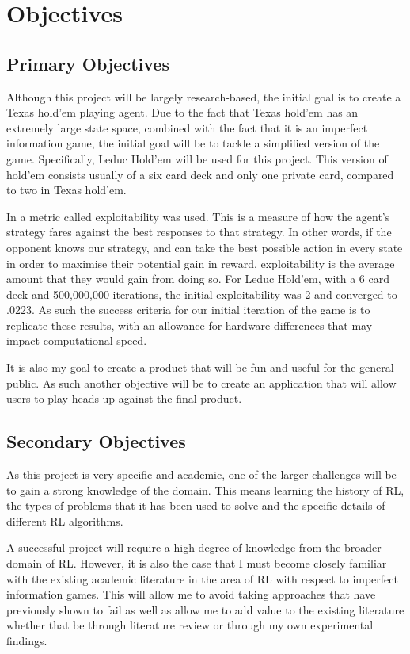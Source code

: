\section{Objectives}\label{sec:objectives}
\subsection{Primary Objectives}\label{subsec:primaryObjectives}

Although this project will be largely research-based, the initial goal is to create a Texas hold'em
playing agent.
Due to the fact that Texas hold'em has an extremely large state space, combined with the fact that it
is an imperfect information game, the initial goal will be to tackle a simplified version of the game.
Specifically, Leduc Hold'em will be used for this project.
This version of hold'em consists usually of a six card deck and only one private card, compared to two in Texas hold'em.

In\citep{heinrich2015smooth} a metric called exploitability was used.
This is a measure of how the agent's strategy fares against the best responses to that strategy.
In other words, if the opponent knows our strategy, and can take the best possible action
in every state in order to maximise their potential gain in reward, exploitability is the average amount
that they would gain from doing so.
For Leduc Hold'em, with a 6 card deck and 500,000,000 iterations, the initial exploitability was 2 and converged
to .0223.
As such the success criteria for our initial iteration of the game is to replicate these results, with an
allowance for hardware differences that may impact computational speed.

It is also my goal to create a product that will be fun and useful for the general public.
As such another objective will be to create an application that will allow users to play heads-up
against the final product.

\subsection{Secondary Objectives}\label{subsec:secondaryObjectives}
As this project is very specific and academic, one of the larger challenges will be to gain a strong knowledge
of the domain.
This means learning the history of RL, the types of problems that it has been used to solve and the specific details of
different RL algorithms.

A successful project will require a high degree of knowledge from the broader domain of RL. However, it is also the case
that I must become closely familiar with the existing academic literature in the area of RL with respect to imperfect
information games.
This will allow me to avoid taking approaches that have previously shown to fail as well as allow me to add value to
the existing literature whether that be through literature review or through my own experimental findings.


